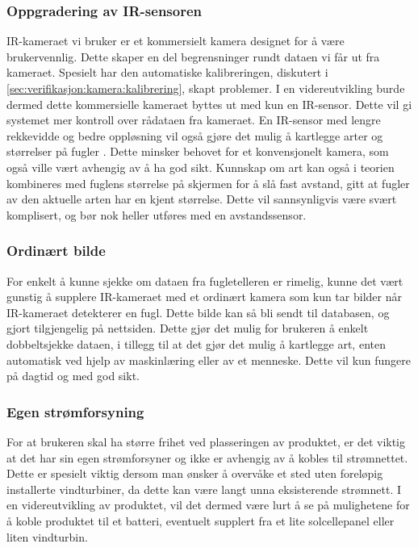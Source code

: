 \subsubsection{Oppgradering av IR-sensoren}
IR-kameraet vi bruker er et kommersielt kamera designet for å være brukervennlig. 
Dette skaper en del begrensninger rundt dataen vi får ut fra kameraet. 
Spesielt har den automatiske kalibreringen, diskutert i \autoref{sec:verifikasjon:kamera:kalibrering}, skapt problemer.  
I en videreutvikling burde dermed dette kommersielle kameraet byttes ut med kun en IR-sensor. 
Dette vil gi systemet mer kontroll over rådataen fra kameraet.
En IR-sensor med lengre rekkevidde og bedre oppløsning vil også gjøre det mulig å kartlegge arter og størrelser på fugler \cite{species}. 
Dette minsker behovet for et konvensjonelt kamera, som også ville vært avhengig av å ha god sikt. 
Kunnskap om art kan også i teorien kombineres med fuglens størrelse på skjermen for å slå fast avstand, gitt at fugler av den aktuelle arten har en kjent størrelse. 
Dette vil sannsynligvis være svært komplisert, og bør nok heller utføres med en avstandssensor.

\subsubsection{Ordinært bilde}
For enkelt å kunne sjekke om dataen fra fugletelleren er rimelig, kunne det vært gunstig å supplere IR-kameraet med et ordinært kamera som kun tar bilder når IR-kameraet detekterer en fugl.
Dette bilde kan så bli sendt til databasen, og gjort tilgjengelig på nettsiden.
Dette gjør det mulig for brukeren å enkelt dobbeltsjekke dataen, i tillegg til at det gjør det mulig å kartlegge art, enten automatisk ved hjelp av maskinlæring eller av et menneske. Dette vil kun fungere på dagtid og med god sikt.

\subsubsection{Egen strømforsyning}
For at brukeren skal ha større frihet ved plasseringen av produktet, er det viktig at det har sin egen strømforsyner og ikke er avhengig av å kobles til strømnettet.
Dette er spesielt viktig dersom man ønsker å overvåke et sted uten foreløpig installerte vindturbiner, da dette kan være langt unna eksisterende strømnett.
I en videreutvikling av produktet, vil det dermed være lurt å se på mulighetene for å koble produktet til et batteri, eventuelt supplert fra et lite solcellepanel eller liten vindturbin. 
 

